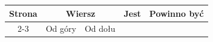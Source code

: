 \documentclass[a4paper,11pt]{article}
\numberwithin{equation}{section}
\renewcommand{\lambda}{\uplambda}
\begin{document}
\begin{center}

  \begin{tabular}{|c|c|c|c|c|}
    \hline
    Strona & \multicolumn{2}{c|}{Wiersz} & Jest
                              & Powinno być \\ \cline{2-3}
    & Od góry & Od dołu & & \\
    \hline
    \hline
  \end{tabular}

\end{center}

\VerSpaceTwo

\end{document}
